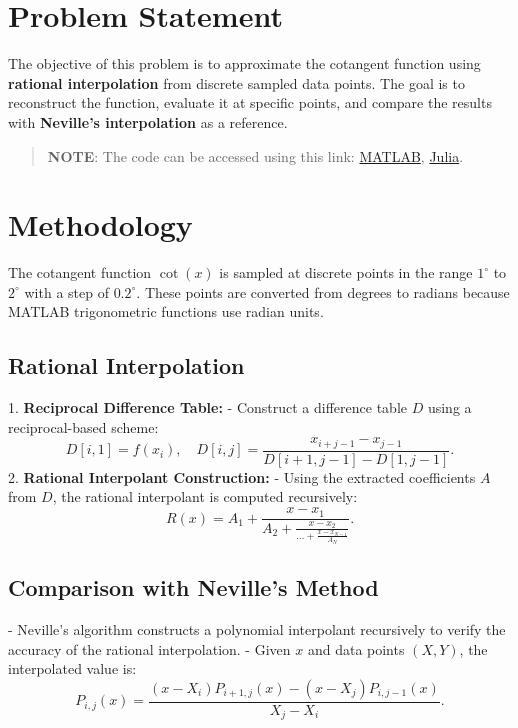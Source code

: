 \section*{Problem Statement}
The objective of this problem is to approximate the cotangent function using \textbf{rational interpolation} from discrete sampled data points. The goal is to reconstruct the function, evaluate it at specific points, and compare the results with \textbf{Neville’s interpolation} as a reference.

\begin{quote}
  \textbf{NOTE}: The code can be accessed using this link: \href{https://raw.githubusercontent.com/HavokSahil/computational-techniques-assignments/refs/heads/main/assignment5/a1.m}{MATLAB}, \href{https://raw.githubusercontent.com/HavokSahil/computational-techniques-assignments/refs/heads/main/assignment5/a1.jl}{Julia}.
\end{quote}

\section*{Methodology}
The cotangent function \( \cot(x) \) is sampled at discrete points in the range \(1^\circ\) to \(2^\circ\) with a step of \(0.2^\circ\). These points are converted from degrees to radians because MATLAB trigonometric functions use radian units.

\subsection*{Rational Interpolation}
1. \textbf{Reciprocal Difference Table:}
   - Construct a difference table \(D\) using a reciprocal-based scheme:
   \[
   D[i,1] = f(x_i), \quad D[i,j] = \frac{x_{i+j-1} - x_{j-1}}{D[i+1,j-1] - D[1,j-1]}.
   \]
2. \textbf{Rational Interpolant Construction:}
   - Using the extracted coefficients \(A\) from \(D\), the rational interpolant is computed recursively:
   \[
   R(x) = A_1 + \frac{x - x_1}{A_2 + \frac{x - x_2}{\dots + \frac{x - x_{N-1}}{A_N}}}.
   \]

\subsection*{Comparison with Neville’s Method}
- Neville’s algorithm constructs a polynomial interpolant recursively to verify the accuracy of the rational interpolation.
- Given \(x\) and data points \((X, Y)\), the interpolated value is:
\[
P_{i,j}(x) = \frac{(x - X_i) P_{i+1,j}(x) - (x - X_j) P_{i,j-1}(x)}{X_j - X_i}.
\]


